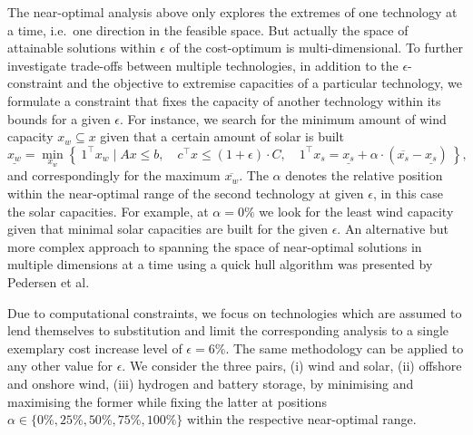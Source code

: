 The near-optimal analysis above only explores the extremes of one technology at
a time, i.e.~one direction in the feasible space. But actually the space of
attainable solutions within $\epsilon$ of the cost-optimum is multi-dimensional.
To further investigate trade-offs between multiple technologies, in addition to
the $\epsilon$-constraint and the objective to extremise capacities of a
particular technology, we formulate a constraint that fixes the capacity of
another technology within its bounds for a given $\epsilon$. For instance, we
search for the minimum amount of wind capacity $x_w \subseteq x$ given that a
certain amount of solar is built
\begin{equation}
    \label{eq:2D}
    \underline{x_w} = \min_{x_w}\left\{\:1^\top x_w \mid Ax\leq b,\quad c^\top x\leq (1+\epsilon)\cdot C, \quad 1^\top x_s = \underline{x_s} + \alpha \cdot (\overline{x_s}-\underline{x_s}) \:\right\},
\end{equation}
and correspondingly for the maximum $\overline{x_w}$. The $\alpha$ denotes the
relative position within the near-optimal range of the second technology at
given $\epsilon$, in this case the solar capacities. For example, at
$\alpha=0\%$ we look for the least wind capacity given that minimal solar
capacities are built for the given $\epsilon$. An alternative but more complex
approach to spanning the space of near-optimal solutions in multiple dimensions
at a time using a quick hull algorithm was presented by Pedersen et
al.~\cite{pedersen_modeling_2020}


Due to computational constraints, we focus on technologies which are assumed to
lend themselves to substitution and limit the corresponding analysis to a single
exemplary cost increase level of $\epsilon=6\%$. The same methodology can be
applied to any other value for $\epsilon$. We consider the three pairs, (i) wind
and solar, (ii) offshore and onshore wind, (iii) hydrogen and battery storage,
by minimising and maximising the former while fixing the latter at positions
$\alpha \in \{0\%,25\%,50\%,75\%,100\%\}$ within the respective near-optimal
range.

